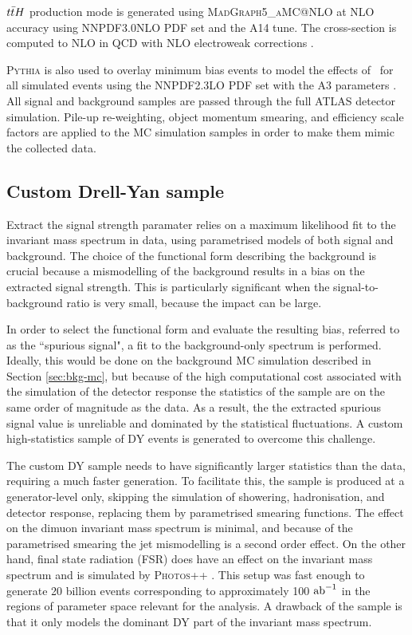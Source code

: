 $t\bar{t} H$ production mode is generated using \textsc{MadGraph5\_aMC@NLO}
\cite{Alwall:2014hca, Artoisenet:2012st} at NLO accuracy using
NNPDF3.0NLO PDF set and the A14 tune. The cross-section is
computed to NLO in QCD with NLO electroweak corrections
\cite{Yu:2014cka, Beenakker:2002nc}.

\textsc{Pythia} is also used to
overlay minimum bias events to model the effects of \pileup~for all
simulated events using the NNPDF2.3LO PDF set \cite{Ball:2012cx}
with the A3 parameters \cite{ATL-PHYS-PUB-2016-017}. All signal
and background samples are passed through the full ATLAS
detector simulation. Pile-up re-weighting, object momentum
smearing, and efficiency scale factors are applied to the MC
simulation samples in order to make them mimic the collected data.

\subsection{Custom Drell-Yan sample}
\label{sec:hmumu:customDY}

Extract the signal strength paramater relies on a
maximum likelihood fit to the invariant mass spectrum in data,
using parametrised models of both signal and background. The choice
of the functional form describing the background is crucial because
a mismodelling of the background results in a bias on the extracted
signal strength. This is particularly significant when the
signal-to-background ratio is very small, because the impact can be
large.

In order to select the functional form and evaluate the resulting
bias, referred to as the ``spurious signal", a fit to the
background-only spectrum is performed. Ideally, this would be done
on the background MC simulation described in Section \ref{sec:bkg-mc},
but because of the high computational cost associated with the 
simulation of the detector response the statistics of the sample
are on the same order of magnitude as the data. As a result, the
the extracted spurious signal value is unreliable and dominated by
the statistical fluctuations. A custom high-statistics sample of DY
events is generated to overcome this challenge.

The custom DY sample needs to have significantly larger statistics
than the data, requiring a much faster generation. To facilitate
this, the sample is produced at a generator-level only, skipping
the simulation of showering, hadronisation, and detector response,
replacing them by parametrised smearing functions. The effect on
the dimuon invariant mass spectrum is minimal, and because of the
parametrised smearing the jet mismodelling is a second order effect.
On the other hand, final state radiation (FSR) does have an effect on
the invariant mass spectrum and is simulated by \textsc{Photos++}
\cite{Golonka:2006tw}. This setup was fast enough to generate 20
billion events corresponding to approximately 100 $\text{ab}^{-1}$ in the 
regions of parameter space relevant for the analysis. A drawback of
the sample is that it only models the dominant DY part of the
invariant mass spectrum.

